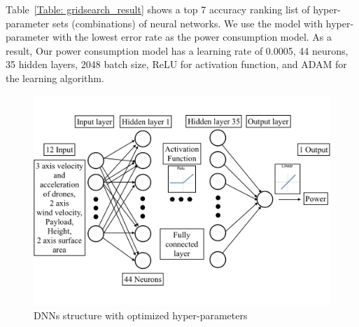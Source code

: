 \documentclass[journal]{./template/IEEEtran}
\begin{document}
\begin{table}[ht]
\caption{The list of grid search results}
\label{Table: gridsearch_result}
\end{table}

Table~\ref{Table: gridsearch_result} shows a top 7 accuracy ranking list of hyper-parameter sets (combinations) of neural networks.
We use the model with hyper-parameter with the lowest error rate as the power consumption model. As a result, Our power consumption model has a learning rate of 0.0005, 44 neurons, 35 hidden layers, 2048 batch size, ReLU for activation function, and ADAM for the learning algorithm. 

\begin{figure}[htbp]
\centering\includegraphics[scale=0.285]{fig6/neural_structure.pdf}
\caption{DNNs structure with optimized hyper-parameters}
\label{fig:DNN_structure}
\end{figure}
\end{document}
